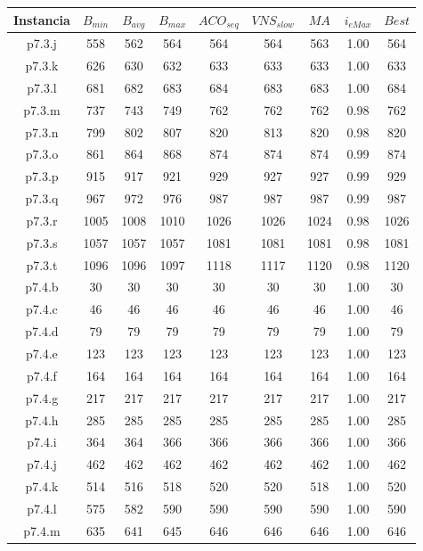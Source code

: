 \begin{table}
\begin{center}
\begin{tabular}{ |c|c|c|c|c|c|c|c|c| } 
\hline
Instancia & $B_{min}$ & $B_{avg}$ & $B_{max}$ & $ACO_{seq}$ & $VNS_{slow}$ & $MA$ & $i_{eMax}$ & $Best$ \\
\hline
p7.3.j & 558 & 562 & 564 & 564 & 564 & 563 & 1.00 & 564  \\
p7.3.k & 626 & 630 & 632 & 633 & 633 & 633 & 1.00 & 633  \\
p7.3.l & 681 & 682 & 683 & 684 & 683 & 683 & 1.00 & 684  \\
p7.3.m & 737 & 743 & 749 & 762 & 762 & 762 & 0.98 & 762  \\
p7.3.n & 799 & 802 & 807 & 820 & 813 & 820 & 0.98 & 820  \\
p7.3.o & 861 & 864 & 868 & 874 & 874 & 874 & 0.99 & 874  \\
p7.3.p & 915 & 917 & 921 & 929 & 927 & 927 & 0.99 & 929  \\
p7.3.q & 967 & 972 & 976 & 987 & 987 & 987 & 0.99 & 987  \\
p7.3.r & 1005 & 1008 & 1010 & 1026 & 1026 & 1024 & 0.98 & 1026  \\
p7.3.s & 1057 & 1057 & 1057 & 1081 & 1081 & 1081 & 0.98 & 1081  \\
p7.3.t & 1096 & 1096 & 1097 & 1118 & 1117 & 1120 & 0.98 & 1120  \\
p7.4.b & 30 & 30 & 30 & 30 & 30 & 30 & 1.00 & 30  \\
p7.4.c & 46 & 46 & 46 & 46 & 46 & 46 & 1.00 & 46  \\
p7.4.d & 79 & 79 & 79 & 79 & 79 & 79 & 1.00 & 79  \\
p7.4.e & 123 & 123 & 123 & 123 & 123 & 123 & 1.00 & 123  \\
p7.4.f & 164 & 164 & 164 & 164 & 164 & 164 & 1.00 & 164  \\
p7.4.g & 217 & 217 & 217 & 217 & 217 & 217 & 1.00 & 217  \\
p7.4.h & 285 & 285 & 285 & 285 & 285 & 285 & 1.00 & 285  \\
p7.4.i & 364 & 364 & 366 & 366 & 366 & 366 & 1.00 & 366  \\
p7.4.j & 462 & 462 & 462 & 462 & 462 & 462 & 1.00 & 462  \\
p7.4.k & 514 & 516 & 518 & 520 & 520 & 518 & 1.00 & 520  \\
p7.4.l & 575 & 582 & 590 & 590 & 590 & 590 & 1.00 & 590  \\
p7.4.m & 635 & 641 & 645 & 646 & 646 & 646 & 1.00 & 646  \\

\end{tabular}
\end{center}
\end{table}
